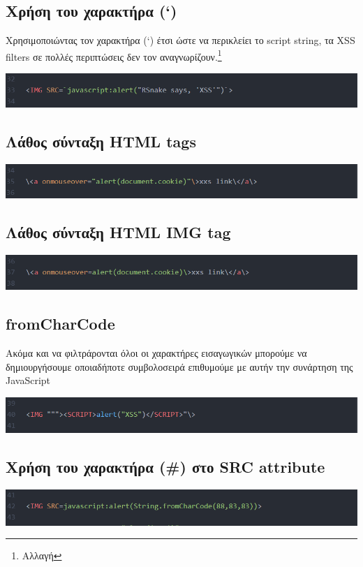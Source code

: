 \subsection{Χρήση του χαρακτήρα (`)}
\noindent
Χρησιμοποιώντας τον χαρακτήρα (`) έτσι ώστε να περικλείει το script string, τα XSS filters  σε πολλές περιπτώσεις δεν τον αναγνωρίζουν.\footnote{Αλλαγή}
\begin{center}
			\includegraphics[width=1\textwidth]{image/11.PNG}		
\end{center}

\subsection{Λάθος σύνταξη HTML tags}
\begin{center}
			\includegraphics[width=1\textwidth]{image/12.PNG}		
\end{center}
\subsection{Λάθος σύνταξη HTML IMG tag}
\begin{center}
			\includegraphics[width=1\textwidth]{image/13.PNG}		
\end{center}
\subsection{fromCharCode}
\noindent
Ακόμα και να φιλτράρονται όλοι οι χαρακτήρες εισαγωγικών μπορούμε να δημιουργήσουμε οποιαδήποτε συμβολοσειρά επιθυμούμε με αυτήν την συνάρτηση της JavaScript
\begin{center}
			\includegraphics[width=1\textwidth]{image/14.PNG}		
\end{center}
\subsection{Χρήση του χαρακτήρα (\#) στο SRC attribute }
\begin{center}
			\includegraphics[width=1\textwidth]{image/15.PNG}		
\end{center}
